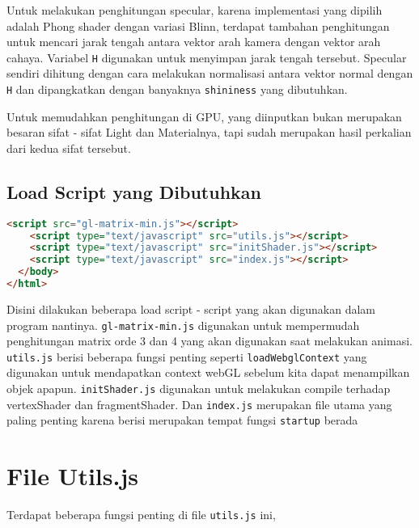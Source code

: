 Untuk melakukan penghitungan specular, karena implementasi yang dipilih adalah Phong shader dengan variasi Blinn, terdapat tambahan penghitungan untuk mencari jarak tengah antara vektor arah kamera dengan vektor arah cahaya. Variabel \texttt{H} digunakan untuk menyimpan jarak tengah tersebut. Specular sendiri dihitung dengan cara melakukan normalisasi antara vektor normal dengan \texttt{H} dan dipangkatkan dengan banyaknya \texttt{shininess} yang dibutuhkan.

Untuk memudahkan penghitungan di GPU, yang diinputkan bukan merupakan besaran sifat - sifat Light dan Materialnya, tapi sudah merupakan hasil perkalian dari kedua sifat tersebut.

\subsection*{Load Script yang Dibutuhkan}

\begin{lstlisting}[language=html, label={lst: neccessary script}, caption={file Load Script}]
    <script src="gl-matrix-min.js"></script>
    <script type="text/javascript" src="utils.js"></script>
    <script type="text/javascript" src="initShader.js"></script>
    <script type="text/javascript" src="index.js"></script>
  </body>
</html>
\end{lstlisting}

Disini dilakukan beberapa load script - script yang akan digunakan dalam program nantinya. \texttt{gl-matrix-min.js} digunakan untuk mempermudah penghitungan matrix orde 3 dan 4 yang akan digunakan saat melakukan animasi. \texttt{utils.js} berisi beberapa fungsi penting seperti \texttt{loadWebglContext} yang digunakan untuk mendapatkan context webGL sebelum kita dapat menampilkan objek apapun. \texttt{initShader.js} digunakan untuk melakukan compile terhadap vertexShader dan fragmentShader. Dan \texttt{index.js} merupakan file utama yang paling penting karena berisi merupakan tempat fungsi \texttt{startup} berada

\section{File Utils.js}

Terdapat beberapa fungsi penting di file \texttt{utils.js} ini,

